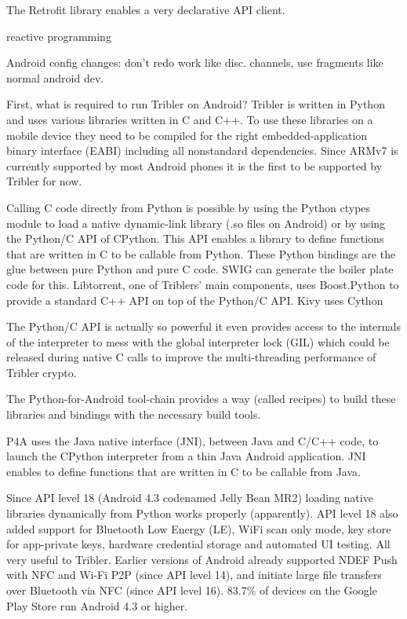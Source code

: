 The Retrofit library enables a very declarative API client.

reactive programming



Android config changes: don't redo work like disc. channels, use fragments like normal android dev.




First, what is required to run Tribler on Android?
Tribler is written in Python and uses various libraries written in C and C++.
To use these libraries on a mobile device they need to be compiled for the right embedded-application binary interface (EABI) including all nonstandard dependencies.
Since ARMv7 is currently supported by most Android phones it is the first to be supported by Tribler for now.


Calling C code directly from Python is possible by using the Python ctypes module to load a native dynamic-link library (.so files on Android) or by using the Python/C API of CPython.
This API enables a library to define functions that are written in C to be callable from Python.
These Python bindings are the glue between pure Python and pure C code.
SWIG can generate the boiler plate code for this.
Libtorrent, one of Triblers' main components, uses Boost.Python to provide a standard C++ API on top of the Python/C API.
Kivy uses Cython

The Python/C API is actually so powerful it even provides access to the internals of the interpreter to mess with the global interpreter lock (GIL) which could be released during native C calls to improve the multi-threading performance of Tribler crypto.

The Python-for-Android tool-chain provides a way (called recipes) to build these libraries and bindings with the necessary build tools.

P4A uses the Java native interface (JNI), between Java and C/C++ code, to launch the CPython interpreter from a thin Java Android application.
JNI enables to define functions that are written in C to be callable from Java.


Since API level 18 (Android 4.3 codenamed Jelly Bean MR2) loading native libraries dynamically from Python works properly (apparently).
API level 18 also added support for Bluetooth Low Energy (LE), WiFi scan only mode, key store for app-private keys, hardware credential storage and automated UI testing.
All very useful to Tribler.
Earlier versions of Android already supported NDEF Push with NFC and Wi-Fi P2P (since API level 14), and initiate large file transfers over Bluetooth via NFC (since API level 16).
83.7\% of devices on the Google Play Store run Android 4.3 or higher.


